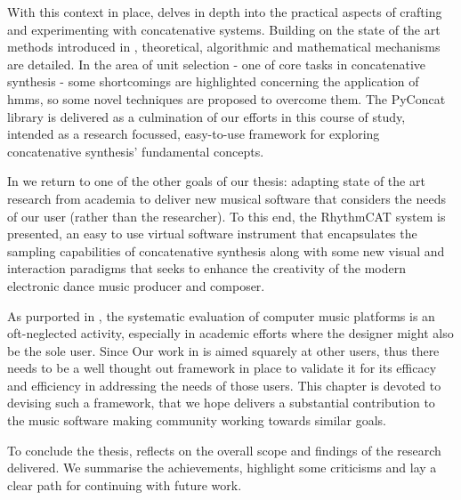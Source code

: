 With this context in place,  delves in depth into the practical aspects of crafting and experimenting with concatenative systems. Building on the state of the art methods introduced in , theoretical, algorithmic and mathematical mechanisms are detailed. In the area of unit selection - one of core tasks in concatenative synthesis - some shortcomings are highlighted concerning the application of \acrfull{hmm}s, so some novel techniques are proposed to overcome them. The PyConcat library is delivered as a culmination of our efforts in this course of study, intended as a research focussed, easy-to-use framework for exploring concatenative synthesis’ fundamental concepts.

In  we return to one of the other goals of our thesis: adapting state of the art research from academia to deliver new musical software that considers the needs of our user (rather than the researcher). To this end, the RhythmCAT system is presented, an easy to use virtual software instrument that encapsulates the sampling capabilities of concatenative synthesis along with some new visual and interaction paradigms that seeks to enhance the creativity of the modern electronic dance music producer and composer. 

As purported in , the systematic evaluation of computer music platforms is an oft-neglected activity, especially in academic efforts where the designer might also be the sole user. Since Our work in  is aimed squarely at other users, thus there needs to be a well thought out framework in place to validate it for its efficacy and efficiency in addressing the needs of those users. This chapter is devoted to devising such a framework, that we hope delivers a substantial contribution to the music software making community working towards similar goals.

To conclude the thesis,  reflects on the overall scope and findings of the research delivered. We summarise the achievements, highlight some criticisms and lay a clear path for continuing with future work. 


 
